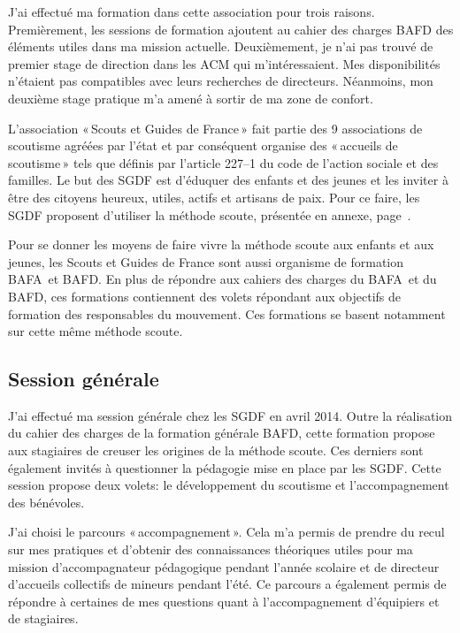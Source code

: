 \documentclass[titlepage,11pt,a4paper]{article}
\begin{document}
J'ai effectué ma formation dans cette association pour trois raisons. Premièrement,
les sessions de formation ajoutent au cahier des charges BAFD des éléments utiles dans ma
mission actuelle. Deuxièmement, je n'ai pas trouvé de premier stage de direction dans les ACM qui
m'intéressaient. Mes disponibilités n'étaient pas compatibles avec leurs recherches de
directeurs. Néanmoins, mon deuxième stage pratique m'a amené à sortir de ma zone de confort.

L'association «\,Scouts et Guides de France\,» fait partie des 9 associations de scoutisme agréées par
l'état et par conséquent organise des «\,accueils de scoutisme\,» tels que définis par
l'article 227--1 du code de l'action sociale et des familles. Le but des SGDF est d'éduquer
des enfants et des jeunes et les inviter à être des citoyens heureux, utiles, actifs et artisans
de paix. Pour ce faire, les SGDF proposent d'utiliser la méthode scoute, présentée en
annexe, page~\pageref{methsc}.

Pour se donner les moyens de faire vivre la méthode scoute aux enfants et aux jeunes, les
Scouts et Guides de France sont aussi organisme de formation BAFA et BAFD\@. En plus de répondre aux cahiers des
charges du BAFA et du BAFD, ces formations contiennent des volets répondant aux objectifs
de formation des responsables du mouvement. Ces formations se basent notamment sur cette même méthode scoute.

\subsection{Session générale}

J'ai effectué ma session générale chez les SGDF en avril 2014.
Outre la réalisation du cahier des charges de la formation générale BAFD,
cette formation propose aux stagiaires de creuser les origines de la méthode scoute. Ces
derniers sont également invités à questionner la pédagogie mise en place par les SGDF\@.
Cette session propose deux volets: le développement du scoutisme et l'accompagnement des bénévoles.

J'ai choisi le parcours «\,accompagnement\,». Cela m'a permis de prendre du recul sur mes
pratiques et d'obtenir des connaissances théoriques utiles pour ma mission
d’accompagnateur pédagogique pendant l'année scolaire et de directeur d’accueils
collectifs de mineurs pendant l'été. Ce parcours a également permis de répondre à
certaines de mes questions quant à l'accompagnement d'équipiers et de stagiaires.
\end{document}
